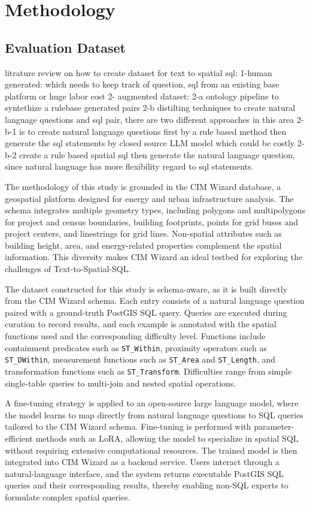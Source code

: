 \section{Methodology}
\label{sec:method}

\subsection{Evaluation Dataset} litrature review on how to create dataset for text to spatial sql: 1-human generated: which needs to keep track of question, sql from an existing base platform or huge labor cost 2- augmented dataset: 2-a ontology pipeline to syntethize a rulebase generated pairs 2-b distilting techniques to create natural language questions and sql pair, there are two different approaches in this area 2-b-1 is to create natural language questions first by a rule based method then generate the sql statements by closed source LLM model which could be costly 2-b-2 create a rule based spatial sql then generate the natural language question, since natural language has more flexibility regard to sql statements.

The methodology of this study is grounded in the CIM Wizard database, a geospatial platform designed for energy and urban infrastructure analysis. The schema integrates multiple geometry types, including polygons and multipolygons for project and census boundaries, building footprints, points for grid buses and project centers, and linestrings for grid lines. Non-spatial attributes such as building height, area, and energy-related properties complement the spatial information. This diversity makes CIM Wizard an ideal testbed for exploring the challenges of Text-to-Spatial-SQL.

The dataset constructed for this study is schema-aware, as it is built directly from the CIM Wizard schema. Each entry consists of a natural language question paired with a ground-truth PostGIS SQL query. Queries are executed during curation to record results, and each example is annotated with the spatial functions used and the corresponding difficulty level. Functions include containment predicates such as \texttt{ST\_Within}, proximity operators such as \texttt{ST\_DWithin}, measurement functions such as \texttt{ST\_Area} and \texttt{ST\_Length}, and transformation functions such as \texttt{ST\_Transform}. Difficulties range from simple single-table queries to multi-join and nested spatial operations.

A fine-tuning strategy is applied to an open-source large language model, where the model learns to map directly from natural language questions to SQL queries tailored to the CIM Wizard schema. Fine-tuning is performed with parameter-efficient methods such as LoRA, allowing the model to specialize in spatial SQL without requiring extensive computational resources. The trained model is then integrated into CIM Wizard as a backend service. Users interact through a natural-language interface, and the system returns executable PostGIS SQL queries and their corresponding results, thereby enabling non-SQL experts to formulate complex spatial queries.

